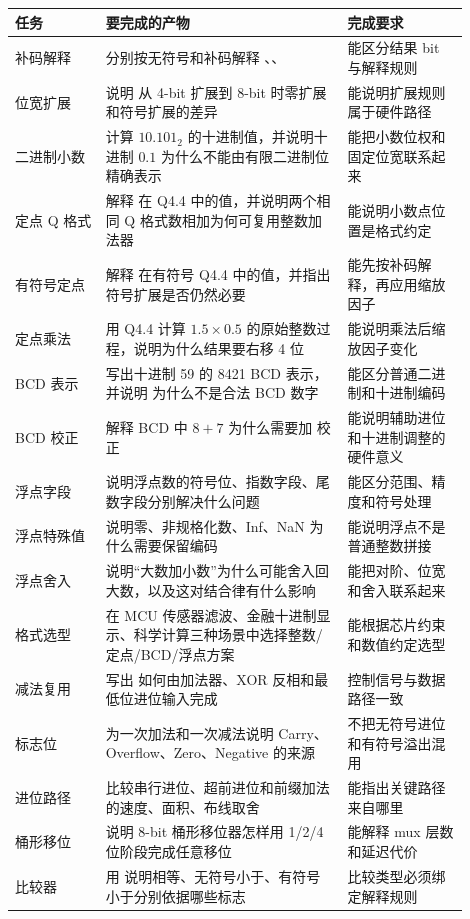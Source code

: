 \begin{longtable}{L{0.18\linewidth}L{0.48\linewidth}L{0.24\linewidth}}
\toprule
任务 & 要完成的产物 & 完成要求 \\
\midrule
补码解释 & 分别按无符号和补码解释 、、 & 能区分结果 bit 与解释规则 \\
位宽扩展 & 说明  从 4-bit 扩展到 8-bit 时零扩展和符号扩展的差异 & 能说明扩展规则属于硬件路径 \\
二进制小数 & 计算 $10.101_2$ 的十进制值，并说明十进制 $0.1$ 为什么不能由有限二进制位精确表示 & 能把小数位权和固定位宽联系起来 \\
定点 Q 格式 & 解释  在 Q4.4 中的值，并说明两个相同 Q 格式数相加为何可复用整数加法器 & 能说明小数点位置是格式约定 \\
有符号定点 & 解释  在有符号 Q4.4 中的值，并指出符号扩展是否仍然必要 & 能先按补码解释，再应用缩放因子 \\
定点乘法 & 用 Q4.4 计算 $1.5 \times 0.5$ 的原始整数过程，说明为什么结果要右移 4 位 & 能说明乘法后缩放因子变化 \\
BCD 表示 & 写出十进制 59 的 8421 BCD 表示，并说明  为什么不是合法 BCD 数字 & 能区分普通二进制和十进制编码 \\
BCD 校正 & 解释 BCD 中 $8+7$ 为什么需要加  校正 & 能说明辅助进位和十进制调整的硬件意义 \\
浮点字段 & 说明浮点数的符号位、指数字段、尾数字段分别解决什么问题 & 能区分范围、精度和符号处理 \\
浮点特殊值 & 说明零、非规格化数、Inf、NaN 为什么需要保留编码 & 能说明浮点不是普通整数拼接 \\
浮点舍入 & 说明“大数加小数”为什么可能舍入回大数，以及这对结合律有什么影响 & 能把对阶、位宽和舍入联系起来 \\
格式选型 & 在 MCU 传感器滤波、金融十进制显示、科学计算三种场景中选择整数/定点/BCD/浮点方案 & 能根据芯片约束和数值约定选型 \\
减法复用 & 写出  如何由加法器、XOR 反相和最低位进位输入完成 & 控制信号与数据路径一致 \\
标志位 & 为一次加法和一次减法说明 Carry、Overflow、Zero、Negative 的来源 & 不把无符号进位和有符号溢出混用 \\
进位路径 & 比较串行进位、超前进位和前缀加法的速度、面积、布线取舍 & 能指出关键路径来自哪里 \\
桶形移位 & 说明 8-bit 桶形移位器怎样用 1/2/4 位阶段完成任意移位 & 能解释 mux 层数和延迟代价 \\
比较器 & 用  说明相等、无符号小于、有符号小于分别依据哪些标志 & 比较类型必须绑定解释规则 \\

\end{longtable}
